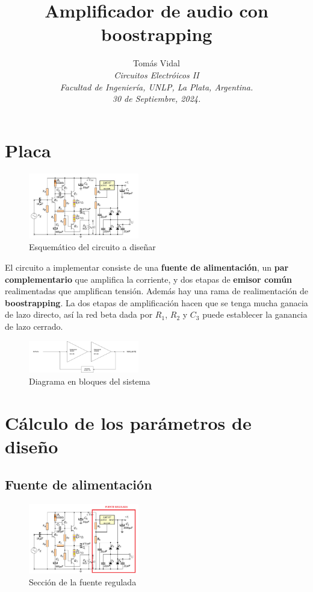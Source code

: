 \documentclass[letterpaper, 10 pt, conference]{ieeeconf}  %
\title{\LARGE \bf Amplificador de audio con boostrapping}
\author{
  Tom\'as Vidal\\
  {\it Circuitos Electróicos II}\\
  {\it Facultad de Ingenier\'ia, UNLP, La Plata, Argentina.}\\
  {\it 30 de Septiembre, 2024.}
}                                            %
\begin{document}
\maketitle
\thispagestyle{empty}
\pagestyle{empty}

\section{Placa}
\begin{figure}[htpb]
  \centering
  \includegraphics[width=0.43\textwidth]{./imagenes/placa.png}
  \caption{Esquemático del circuito a diseñar}
  \label{fig:placa}
\end{figure}
El circuito a implementar consiste de una \textbf{fuente de alimentación}, un \textbf{par complementario} que amplifica la corriente, y dos etapas de \textbf{emisor común} realimentadas que amplifican tensión. Además hay una rama de realimentación de \textbf{boostrapping}. La dos etapas de amplificación hacen que se tenga mucha ganacia de lazo directo, así la red beta dada por $R_1$, $R_2$ y $C_3$ puede establecer la ganancia de lazo cerrado.

\begin{figure}[htbp]
  \centering
  \includegraphics[width=0.43\textwidth]{./imagenes/diag_realimentacion.png}
  \caption{Diagrama en bloques del sistema}
\end{figure}


\section{Cálculo de los parámetros de diseño}
\subsection{Fuente de alimentación}
\begin{figure}[H]
  \centering
  \includegraphics[width=0.43\textwidth]{./imagenes/placa_fuente.png}
  \caption{Sección de la fuente regulada}
  \label{fig:placa_fuente}
\end{figure}
\end{document}
